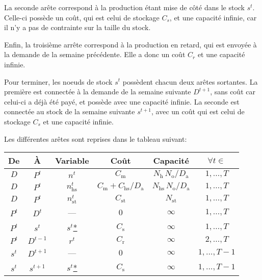 La seconde arête correspond à la production étant mise de côté dans le stock $s^t$. Celle-ci possède un coût, qui est celui de stockage $C_s$, et une capacité infinie, car il n'y a pas de contrainte sur la taille du stock.

Enfin, la troisième arrête correspond à la production en retard, qui est envoyée à la demande de la semaine précédente. Elle a donc un coût $C_r$ et une capacité infinie.

Pour terminer, les noeuds de stock $s^t$ possèdent chacun deux arêtes sortantes. La première est connectée à la demande de la semaine suivante $D^{t+1}$, sans coût car celui-ci a déjà été payé, et possède avec une capacité infinie. La seconde est connectée au stock de la semaine suivante $s^{t+1}$, avec un coût qui est celui de stockage $C_s$ et une capacité infinie.

Les différentes arêtes sont reprises dans le tableau suivant:
\begin{center}
\begin{tabular}{cc|c|cc|c}
    \textbf{De} & \textbf{À} & \textbf{Variable} & \textbf{Coût} & \textbf{Capacité} & $\forall t \in$ \\
    \hline
    $D$ & $P^t$ &
    $n^t$ & $C_\mathrm{m}$ & $N_\mathrm{h}\,N_\mathrm{o}/D_\mathrm{a}$
    & $1,\dots,T$ \\
    \hline
    $D$ & $P^t$ &
    $n_\mathrm{hs}^t$ & $C_\mathrm{m}+C_\mathrm{hs}/D_\mathrm{a}$ & $N_\mathrm{hs}\,N_\mathrm{o}/D_\mathrm{a}$
    & $1,\dots,T$ \\
    \hline
    $D$ & $P^t$ &
    $n_\mathrm{st}^t$ & $C_\mathrm{st}$ & $N_\mathrm{st}$
    & $1,\dots,T$ \\
    
    \hline
    $P^t$ & $D^t$ &
    --- & $0$ & $\infty$
    & $1,\dots,T$ \\
    \hline
    $P^t$ & $s^t$ &
    $s^t$\;\underline{*} & $C_\mathrm{s}$ & $\infty$
    & $1,\dots,T$ \\
    \hline
    $P^t$ & $D^{t-1}$ &
    $r^t$ & $C_\mathrm{r}$ & $\infty$
    & $2,\dots,T$ \\
    
    \hline
    $s^t$ & $D^{t+1}$ &
    --- & $0$ & $\infty$
    & $1,\dots,T-1$ \\
    \hline
    $s^t$ & $s^{t+1}$ &
    $s^t$\;\underline{*} & $C_\mathrm{s}$ & $\infty$
    & $1,\dots,T-1$ \\
\end{tabular}
\end{center}

